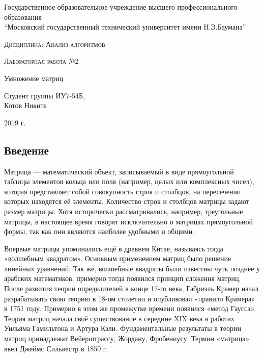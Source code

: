 \documentclass[a4paper,12pt]{article}
\begin{document}
    \begin{titlepage}
        \begin{center}
            \large
            Государственное образовательное учреждение высшего профессионального образования\\
            “Московский государственный технический университет имени Н.Э.Баумана”
            \vspace{3cm}
            
            \textsc{Дисциплина: Анализ алгоритмов}
            \vspace{0.5cm}
                
            \textsc{Лабораторная работа №2}
            \vspace{3cm}
            
            {\LARGE Умножение матриц}
            \vspace{3cm}
            
            Студент группы ИУ7-54Б,\\   
            Котов Никита
            \vfill
            
            2019 г.            
            \end{center}
    \end{titlepage}
    
    \begin{center}
    	\tableofcontents
    \end{center}
	
	\setcounter{page}{2}
	\newpage
    \begin{center}
        \section*{Введение}
    \end{center}
        \label{sec:intro}
\quad Матрица — математический объект, записываемый в виде прямоугольной таблицы элементов кольца или поля (например, целых или комплексных чисел), которая представляет собой совокупность строк и столбцов, на пересечении которых находятся её элементы. Количество строк и столбцов матрицы задают размер матрицы. Хотя исторически рассматривались, например, треугольные матрицы, в настоящее время говорят исключительно о матрицах прямоугольной формы, так как они являются наиболее удобными и общими.

Впервые матрицы упоминались ещё в древнем Китае, называясь тогда «волшебным квадратом». Основным применением матриц было решение линейных уравнений\cite{litlink1}. Так же, волшебные квадраты были известны чуть позднее у арабских математиков, примерно тогда появился принцип сложения матриц. После развития теории определителей в конце 17-го века, Габриэль Крамер начал разрабатывать свою теорию в 18-ом столетии и опубликовал «правило Крамера» в 1751 году. Примерно в этом же промежутке времени появился «метод Гаусса». Теория матриц начала своё существование в середине XIX века в работах Уильяма Гамильтона и Артура Кэли. Фундаментальные результаты в теории матриц принадлежат Вейерштрассу, Жордану, Фробениусу. Термин «матрица» ввел Джеймс Сильвестр в 1850 г\cite{litlink2}.
\end{document}

